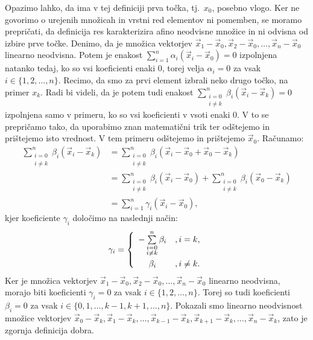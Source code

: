 \documentclass[mat1]{fmfdelo}
\newcommand{\0}{0}
\begin{document}
Opazimo lahko, da ima v tej definiciji prva točka, tj.\ $x_0$, posebno vlogo. Ker ne govorimo o urejenih množicah in vrstni red elementov ni pomemben, se moramo prepričati, da definicija res karakterizira afino neodvisne množice in ni odvisna od izbire prve točke. Denimo, da je množica vektorjev $\vec{x}_1 - \vec{x}_0, \vec{x}_2 - \vec{x}_0, \dots , \vec{x}_n - \vec{x}_0$ linearno neodvisna. Potem je enakost $\sum\limits_{i=1}^n \alpha_i (\vec{x}_i - \vec{x}_0) = 0$ izpolnjena natanko tedaj, ko so vsi koeficienti enaki $0$, torej velja $\alpha_i = 0$ za vsak $i \in \{ 1, 2, \dots, n \}$. Recimo, da smo za prvi element izbrali neko drugo točko, na primer $x_k$. Radi bi videli, da je potem tudi enakost $\sum\limits_{\substack{i=0 \\ i\neq k}}^n \beta_i (\vec{x}_i - \vec{x}_k) = 0$ izpolnjena samo v primeru, ko so vsi koeficienti v vsoti enaki $0$. V to se prepričamo tako, da uporabimo znan matematični trik ter odštejemo in prištejemo isto vrednost. V tem primeru odštejemo in prištejemo $\vec{x}_0$.
Računamo:
\begin{align*} 
\sum\limits_{\substack{i=0 \\ i \neq k}}^n \beta_i (\vec{x}_i - \vec{x}_k) &=  \sum\limits_{\substack{i=0 \\ i \neq k}}^n \beta_i (\vec{x}_i - \vec{x}_0 + \vec{x}_0 - \vec{x}_k) \\
&=\sum\limits_{\substack{i=0 \\ i\neq k}}^n \beta_i (\vec{x}_i - \vec{x}_0) + \sum\limits_{\substack{i=0 \\ i\neq k}}^n \beta_i (\vec{x}_0 - \vec{x}_k)\\
&= \sum\limits_{i=1}^n \gamma_i (\vec{x}_i - \vec{x}_0),
\end{align*}
kjer koeficiente $\gamma_i$ določimo na naslednji način:
\[  \gamma_i =  \left\{
\begin{array}{cl}\vspace{3pt}
	-\sum\limits_{\substack{i=0 \\ i\neq k}}^n \beta_i &, i = k,\\
	\beta_i &, i \neq k. \\
\end{array} 
\right. \]
Ker je množica vektorjev $\vec{x}_1 - \vec{x}_0, \vec{x}_2 - \vec{x}_0, \dots , \vec{x}_n - \vec{x}_0$ linearno neodvisna, morajo biti koeficienti $\gamma_i = 0$ za vsak $i \in \{1, 2, \dots, n \}$. Torej so tudi koeficienti $\beta_i = 0$ za vsak $i \in \{0, 1, \dots, k-1, k+1, \dots, n \}$. Pokazali smo linearno neodvisnost množice vektorjev $\vec{x}_0 - \vec{x}_k, \vec{x}_1 - \vec{x}_k, \dots , \vec{x}_{k-1} - \vec{x}_k, \vec{x}_{k+1} - \vec{x}_k, \dots, \vec{x}_n - \vec{x}_k$, zato je zgornja definicija dobra. 
\end{document}
